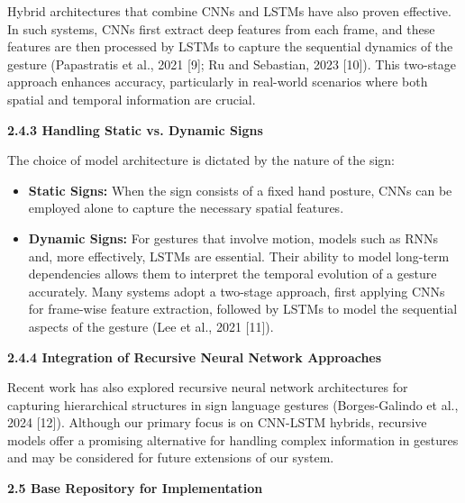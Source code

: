 \documentclass[12pt]{article}
\begin{document}
Hybrid architectures that combine CNNs and LSTMs have also proven effective. In 
such systems, CNNs first extract deep features from each frame, and these features are 
then processed by LSTMs to capture the sequential dynamics of the gesture (Papastratis 
et al., 2021 [9]; Ru and Sebastian, 2023 [10]). This two-stage approach enhances accuracy, 
particularly in real-world scenarios where both spatial and temporal information are crucial.

\vspace{1em}
\noindent
\textbf{2.4.3 Handling Static vs. Dynamic Signs}
\vspace{1em}

The choice of model architecture is dictated by the nature of the sign:
\begin{itemize}
    \item \textbf{Static Signs:} When the sign consists of a fixed hand posture, CNNs can be employed 
    alone to capture the necessary spatial features.
    \item \textbf{Dynamic Signs:} For gestures that involve motion, models such as RNNs and, more 
    effectively, LSTMs are essential. Their ability to model long-term dependencies allows 
    them to interpret the temporal evolution of a gesture accurately. Many systems adopt 
    a two-stage approach, first applying CNNs for frame-wise feature extraction, followed 
    by LSTMs to model the sequential aspects of the gesture (Lee et al., 2021 [11]).
\end{itemize}

\vspace{1em}
\noindent
\textbf{2.4.4 Integration of Recursive Neural Network Approaches}
\vspace{1em}

Recent work has also explored recursive neural network architectures for capturing hierarchical 
structures in sign language gestures (Borges-Galindo et al., 2024 [12]). Although 
our primary focus is on CNN-LSTM hybrids, recursive models offer a promising alternative 
for handling complex information in gestures and may be considered for future 
extensions of our system.


\vspace{1.5em}
\noindent
\textbf{2.5 Base Repository for Implementation}
\vspace{1em}
\end{document}
